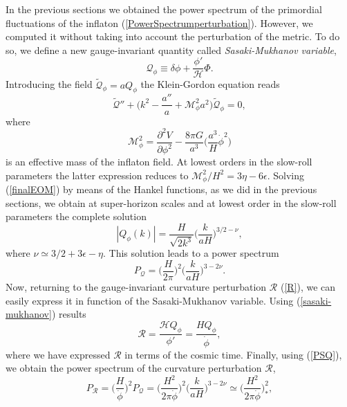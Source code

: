 \documentclass[11pt,a4paper,twoside]{book}
\begin{document}
In the previous sections we obtained the power spectrum of  the primordial fluctuations of the inflaton (\ref{PowerSpectrumperturbation}). However, we computed it without taking into account the perturbation of the metric.
To do so, we define a new gauge-invariant quantity called  \textit{Sasaki-Mukhanov variable},
\begin{equation}
	\label{sasaki-mukhanov}
	\mathcal{Q}_{\phi} \equiv \delta \phi + \frac{\phi'}{\mathcal{H}}\Phi.
\end{equation}
Introducing the field $\tilde{\mathcal{Q}}_{\phi}=aQ_{\phi}$ the Klein-Gordon equation reads \cite{NonGauss:Intro}
\begin{equation}
	\label{finalEOM}
\tilde{\mathcal{Q}}'' + \Big (k^{2} - \frac{a''}{a} + \mathcal{M}_{\phi}^{2}a^{2}\Big)\tilde{\mathcal{Q}}_{\phi} = 0,
\end{equation} 
where 
\begin{equation}
 \mathcal{M}^{2}_{\phi}=\frac{\partial^{2} V}{\partial \phi^{2}} - \frac{8\pi G}{a^{3}}\Big (\frac{a^{3}}{H}\dot{\phi}^{2}\Big)
\end{equation}
is an effective mass of the inflaton field. At lowest orders in the slow-roll parameters the latter expression reduces to $ \mathcal{M}^{2}_{\phi}/H^{2} = 3\eta-6\epsilon $. Solving (\ref{finalEOM}) by means of the Hankel functions, as we did in the previous sections, we obtain at super-horizon scales and at  lowest order in the slow-roll parameters the complete solution
\begin{equation}
	\label{solutionPerturbation}
	|Q_{\phi}(k)| = \frac{H}{\sqrt{2k^{3}}}\Big (\frac{k}{aH}\Big)^{3/2-\nu},
\end{equation}
where $ \nu \simeq 3/2 + 3\epsilon - \eta $.
This solution leads to a power spectrum
\begin{equation}
\label{PSQ}
P_{\mathcal{Q}}=\Big (\frac{H}{2\pi} \Big)^{2}\Big(\frac{k}{aH}\Big)^{3-2\nu}.
\end{equation}
Now, returning to the gauge-invariant curvature perturbation $ \mathcal{R} $ (\ref{R}), we can easily express it in function of the Sasaki-Mukhanov variable. Using (\ref{sasaki-mukhanov}) results
\begin{equation}
	\label{expressionR}
	\mathcal{R}=\dfrac{\mathcal{H}Q_{\phi}}{\phi'} = \frac{H Q_{\phi}}{\dot{\phi}},
\end{equation}
where we have expressed $ \mathcal{R} $ in terms of the cosmic time.
Finally, using (\ref{PSQ}), we obtain the power spectrum of the curvature perturbation $\mathcal{R}$,
\begin{equation}
\label{PR}
P_{\mathcal{R}}=\Big (\frac{H}{\dot{\phi}}\Big)^{2}P_{\mathcal{Q}}= \Big (\frac{H^{2}}{2\pi \dot{\phi}}\Big)^{2}\Big(\frac{k}{aH}\Big)^{3-2\nu} \simeq \Big(\frac{H^{2}}{2\pi\dot{\phi}}\Big)^{2}_{*},
\end{equation}
\end{document}
